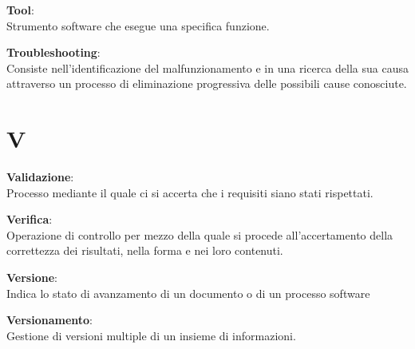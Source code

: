 \documentclass[a4paper, oneside, openany, dvipsnames, table]{article}
\begin{document}
\textbf{Tool}:\\	Strumento software che esegue una specifica funzione.

\textbf{Troubleshooting}:\\	Consiste nell'identificazione del malfunzionamento e in una ricerca della sua causa attraverso un processo di eliminazione progressiva delle possibili cause conosciute.


\newpage
\section{V}
\textbf{Validazione}:\\	Processo mediante il quale ci si accerta che i requisiti siano stati rispettati.

\textbf{Verifica}:\\	Operazione di controllo per mezzo della quale si procede all'accertamento della correttezza dei risultati, nella forma e nei loro contenuti.

\textbf{Versione}:\\ Indica lo stato di avanzamento di un documento o di un processo software

\textbf{Versionamento}:\\	Gestione di versioni multiple di un insieme di informazioni.
\end{document}
